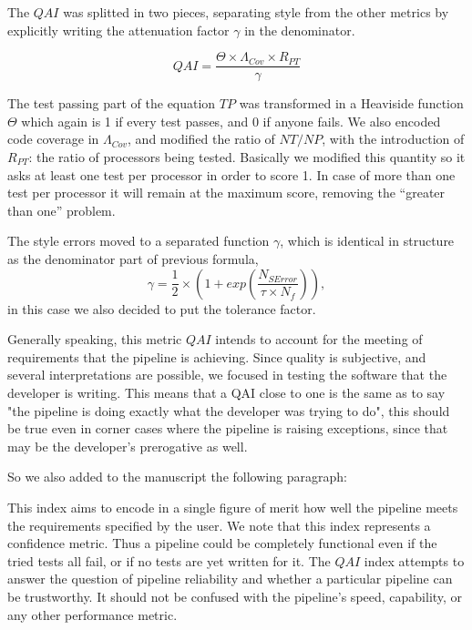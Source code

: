 \documentclass[a4paper,onecolumn,fleqn,usenatbib,useAMS]{mnrasr}
\newenvironment{frshaded}{%
\def\FrameCommand{\fboxrule=\FrameRule\fboxsep=\FrameSep \fcolorbox{framecolor}{shadecolor}}%
\MakeFramed {\FrameRestore}}%
{\endMakeFramed}
\begin{document}
The $QAI$ was splitted in two pieces, separating style from the other metrics by
explicitly writing the attenuation factor $\gamma$ in the denominator.

\begin{displaymath}
 QAI = \frac{ \Theta \times \Lambda_{Cov} \times R_{PT}}{\gamma} 
\end{displaymath} 

The test passing part of the equation $TP$ was transformed in a Heaviside function
$\Theta$ which again is 1 if every test passes, and 0 if anyone fails.
We also encoded code coverage in $\Lambda_{Cov}$, and modified the ratio of $NT/NP$, 
with the introduction of $R_{PT}$: the ratio of processors being tested.
Basically we modified this quantity so it asks at least one test per processor
in order to score 1. In case of more than one test per processor it will remain
at the maximum score, removing the ``greater than one'' problem.

The style errors moved to a separated function $\gamma$, 
which is identical in structure as the denominator part of previous formula,
\begin{displaymath}
 \gamma = \frac{1}{2} \times \left( 1 + exp \left( \frac{N_{SError}}{\tau \times N_f} \right)\right),
\end{displaymath}
in this case we also decided to put the tolerance factor.

Generally speaking, this metric $QAI$ intends to account for the meeting of
requirements that the pipeline is achieving. 
%
Since quality is subjective, and several interpretations are possible,
we focused in testing the software that the developer is writing.  
%
This means that a QAI close to one is the same as to say "the 
pipeline is doing exactly what the developer was trying to do", 
this should be true even in corner cases where the pipeline is raising exceptions,
since that may be the developer’s prerogative as well.

So we also added to the manuscript the following paragraph:

\begin{frshaded}
\begin{multicols}{2} 
   
This index aims to encode in a single figure of merit how well the pipeline
meets the requirements specified by the user.
%
We note that this index represents a confidence metric. 
%
Thus a pipeline could be completely functional even if the 
tried tests all fail, or if no tests are yet written for it.
%
The $QAI$ index attempts to answer the question of pipeline
reliability and whether a particular pipeline can be trustworthy.
%
It should not be confused with the pipeline's speed,
capability, or any other performance metric.
%
\end{multicols} \end{frshaded} 
\end{document}
